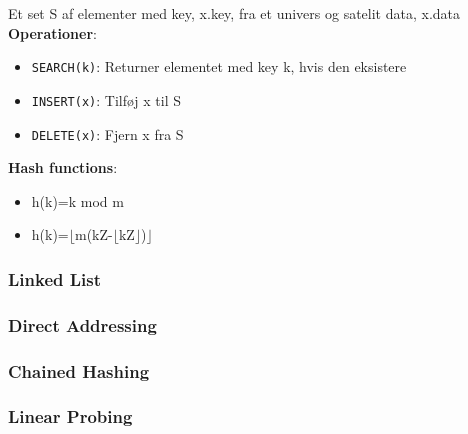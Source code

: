 Et set S af elementer med key, x.key, fra et univers og satelit data, x.data\\
\textbf{Operationer}:
\begin{itemize}
	\item \texttt{SEARCH(k)}: Returner elementet med key k, hvis den eksistere
	\item \texttt{INSERT(x)}: Tilføj x til S
	\item \texttt{DELETE(x)}: Fjern x fra S
\end{itemize}
\textbf{Hash functions}:
\begin{itemize}
	\item h(k)=k mod m
	\item h(k)=$\lfloor$m(kZ-$\lfloor$kZ$\rfloor$)$\rfloor$
\end{itemize}

\subsubsection{Linked List}

\newpage

\subsubsection{Direct Addressing}


\subsubsection{Chained Hashing}

\newpage

\subsubsection{Linear Probing}
